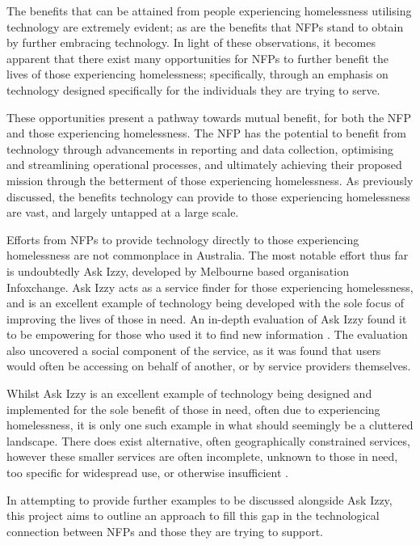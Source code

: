 The benefits that can be attained from people experiencing homelessness utilising technology are extremely evident; as are the benefits that NFPs stand to obtain by further embracing technology. In light of these observations, it becomes apparent that there exist many opportunities for NFPs to further benefit the lives of those experiencing homelessness; specifically, through an emphasis on technology designed specifically for the individuals they are trying to serve.

These opportunities present a pathway towards mutual benefit, for both the NFP and those experiencing homelessness. The NFP has the potential to benefit from technology through advancements in reporting and data collection, optimising and streamlining operational processes, and ultimately achieving their proposed mission through the betterment of those experiencing homelessness. As previously discussed, the benefits technology can provide to those experiencing homelessness are vast, and largely untapped at a large scale.

Efforts from NFPs to provide technology directly to those experiencing homelessness are not commonplace in Australia. The most notable effort thus far is undoubtedly Ask Izzy, developed by Melbourne based organisation Infoxchange. Ask Izzy acts as a service finder for those experiencing homelessness, and is an excellent example of technology being developed with the sole focus of improving the lives of those in need. An in-depth evaluation of Ask Izzy found it to be empowering for those who used it to find new information \cite{burrows2019evaluating}. The evaluation also uncovered a social component of the service, as it was found that users would often be accessing on behalf of another, or by service providers themselves.

Whilst Ask Izzy is an excellent example of technology being designed and implemented for the sole benefit of those in need, often due to experiencing homelessness, it is only one such example in what should seemingly be a cluttered landscape. There does exist alternative, often geographically constrained services, however these smaller services are often incomplete, unknown to those in need, too specific for widespread use, or otherwise insufficient \cite{gough2013improving} \cite{gough2016designing}.

In attempting to provide further examples to be discussed alongside Ask Izzy, this project aims to outline an approach to fill this gap in the technological connection between NFPs and those they are trying to support.

